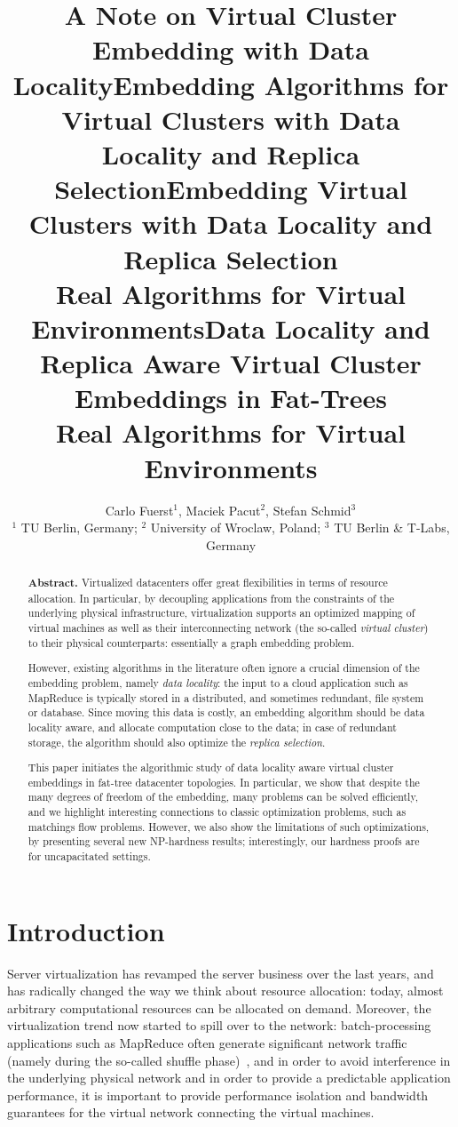 \documentclass[9pt,twocolumn]{scrartcl}
\title{A Note on Virtual Cluster Embedding with Data Locality}
\title{Embedding Algorithms for Virtual Clusters with Data Locality and Replica Selection}
\title{Embedding Virtual Clusters with Data Locality and Replica Selection\\{\Large Real Algorithms for Virtual Environments}}
\title{Data Locality and Replica Aware Virtual Cluster Embeddings in Fat-Trees\\{\Large Real Algorithms for Virtual Environments}}
\author{Carlo Fuerst$^1$, Maciek Pacut$^2$, Stefan Schmid$^3$\\
$^1$ TU Berlin, Germany; $^2$ University of Wroclaw, Poland; $^3$ TU Berlin \& T-Labs, Germany}
\begin{document}
\maketitle


\begin{abstract}
\textbf{Abstract.} Virtualized datacenters offer great flexibilities in terms of resource allocation. In particular, by
decoupling applications from the constraints of the underlying physical infrastructure, virtualization
supports an optimized mapping of virtual machines as well as their interconnecting network (the so-called \emph{virtual cluster}) to their
physical counterparts: essentially a graph embedding problem. 

However, existing algorithms 
in the literature often ignore a crucial dimension of the embedding problem, namely \emph{data locality}: 
the input to a cloud application such as MapReduce is typically stored in a distributed,
and sometimes redundant, file system or database. Since moving this data is costly, an embedding algorithm should be data locality aware,
and allocate computation close to the data; in case of redundant storage, the algorithm should also optimize the \emph{replica selection}.

This paper initiates the algorithmic study of data locality aware virtual cluster embeddings in fat-tree datacenter topologies. 
In particular, we 
show that
despite the many degrees of freedom of the embedding, many problems can be
solved efficiently, and we highlight interesting connections
to classic optimization problems, such as matchings
flow problems. However, we also show the limitations of such optimizations, 
by presenting several new NP-hardness results; interestingly, 
our hardness proofs are for uncapacitated settings. 
\end{abstract}

\section{Introduction}

Server virtualization has revamped the server business over the last years,
and has radically changed the way we think about resource allocation:
today, almost arbitrary computational resources can be allocated on demand.
Moreover, the virtualization trend now started to spill over to the network: 
batch-processing applications such as MapReduce often generate significant
network traffic (namely during the so-called shuffle phase)~\cite{amazonbw}, 
and in order to avoid interference in the underlying physical network and in order to provide a predictable
application performance, it is important to provide performance isolation and bandwidth guarantees 
for the virtual network connecting the virtual machines.~\cite{talk-about}
\end{document}
